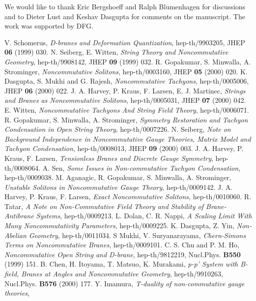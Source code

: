 \documentclass[a4paper,12pt]{article}
\begin{document}
We would like to thank Eric Bergshoeff and Ralph Blumenhagen for discussions
and to Dieter Lust and Keshav Dasgupta for comments on the manuscript.
The work was supported by DFG.
\newpage
\begin{thebibliography}{99}
V. Schomerus, {\it D-branes and Deformation Quantization},
hep-th/9903205, JHEP {\bf 06} (1999) 030.
 N. Seiberg, E. Witten, {\it String Theory and Noncommutative 
Geometry}, hep-th/9908142, JHEP {\bf 09} (1999) 032.
 R. Gopakumar, S. Minwalla, A. Strominger, 
{\it Noncommutative Solitons}, hep-th/0003160, JHEP {\bf 05} (2000) 020.
 K. Dasgupta, S. Mukhi and G. Rajesh, {\it
Noncommutative Tachyons}, hep-th/0005006, JHEP {\bf 06} (2000) 022.
 J. A. Harvey, P. Kraus, F. Larsen, E. J.
Martinec, 
{\it Strings and Branes as Noncommutative Solitons}, hep-th/0005031, 
JHEP {\bf 07} (2000) 042.
 E. Witten, {\it Noncommutative Tachyons
And String Field Theory},  hep-th/0006071.
  R. Gopakumar, S. Minwalla, A. Strominger,
{\it Symmetry Restoration and Tachyon Condensation in Open String Theory},
hep-th/0007226.
 N. Seiberg, 
{\it   Note on Background Independence in Noncommutative Gauge Theories, 
Matrix Model and Tachyon Condensation}, hep-th/0008013, JHEP {\bf 09} 
(2000) 003.
 J. A. Harvey, P. Kraus, F. Larsen,
{\it Tensionless Branes and Discrete Gauge Symmetry}, hep-th/0008064.
  A. Sen, {\it Some Issues in Non-commutative Tachyon 
Condensation}, hep-th/0009038.
 M. Aganagic,  R. Gopakumar, S. Minwalla, A. Strominger,
{\it Unstable Solitons in Noncommutative Gauge Theory}, hep-th/0009142.
 J. A. Harvey, P. Kraus, F. Larsen,
{\it Exact Noncommutative Solitons}, hep-th/0010060.
 R. Tatar, {\it 
A Note on Non-Commutative Field Theory and Stability of Brane-Antibrane 
Systems}, hep-th/0009213.
  L. Dolan, C. R. Nappi, {\it A Scaling Limit With Many 
Noncommutativity Parameters}, hep-th/0009225.
 K. Dasgupta, Z. Yin, {\it Non-Abelian Geometry},
hep-th/0011034.
 S Mukhi, V. Suryanarayama, {\it Chern-Simons Terms on 
Noncommutative Branes}, hep-th/0009101.
 C. S. Chu and P. M. Ho, 
{\it Noncommutative Open String and D-brane}, hep-th/9812219,
Nucl.Phys. {\bf B550} (1999) 151.
 B. Chen, H. Itoyama, T. Matsuo, K. Murakami,
{\it p-p' System with B-field, Branes at Angles and Noncommutative Geometry},
hep-th/9910263, Nucl.Phys. {\bf B576} (2000) 177.
 Y. Imamura, {\it T-duality of non-commutative gauge theories},

\end{thebibliography}
\end{document}
